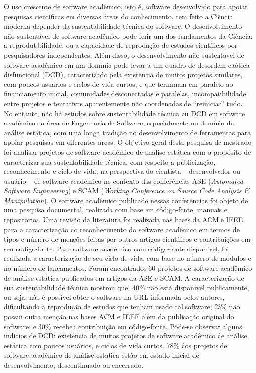 O uso crescente de software acadêmico, isto é, software desenvolvido para
apoiar pesquisas científicas em diversas áreas do conhecimento, tem feito
a Ciência moderna depender da sustentabilidade técnica do software.
%
O desenvolvimento não sustentável de software acadêmico pode ferir um dos
fundamentos da Ciência: a reprodutibilidade, ou a capacidade de reprodução de
estudos científicos por pesquisadores independentes.
%
Além disso, o desenvolvimento não sustentável de software acadêmico em um
domínio pode levar a um quadro de desordem caótica disfuncional (DCD),
caracterizado pela existência de muitos projetos similares, com poucos usuários
e ciclos de vida curtos, e que terminam em paralelo ao financiamento inicial,
comunidades desconectadas e paralelas, incompatibilidade entre projetos e
tentativas aparentemente não coordenadas de ``reiniciar'' tudo.
%
No entanto, não há
estudos sobre sustentabilidade técnica ou DCD em software acadêmico da
área de Engenharia de Software, especialmente no domínio de análise estática,
com uma longa tradição no desenvolvimento de ferramentas para apoiar pesquisas
em diferentes áreas.
%
O objetivo geral desta pesquisa de mestrado foi analisar projetos de
software acadêmico de análise estática 
com o propósito de caracterizar sua sustentabilidade técnica, 
com respeito a publicização, reconhecimento e ciclo de vida, 
na perspectiva do cientista -- desenvolvedor ou usuário -- de software
acadêmico no contexto das conferências 
ASE ({\it Automated Software Engineering}) e SCAM ({\it Working Conference on Source Code
Analysis \& Manipulation}).
%
O software acadêmico publicado nessas conferências 
foi objeto de uma pesquisa documental, realizada com base em código-fonte, 
manuais e repositórios.
%
Uma revisão da literatura foi realizada nas bases da ACM e IEEE
para a caracterização do reconhecimento do software acadêmico
em termos de tipos e número de menções feitas por outros artigos científicos e
contribuições em seu código-fonte.
%
Para software acadêmico com código-fonte disponível, 
foi realizada a caracterização de seu ciclo de vida,
com base no número de módulos e no número de lançamentos.
%
Foram encontrados 60 projetos de software acadêmico de análise estática
publicados em artigos da ASE e SCAM.
%
A caracterização de sua sustentabilidade técnica mostrou que: 
40\% não está disponível publicamente, ou seja, não é possível obter 
o software na URL informada pelos autores, dificultando
a reprodução de estudos que tenham usado tal software;
%
23\% não possui outra menção nas bases ACM e IEEE além da publicação original
do software; e 30\% recebeu contribuição em código-fonte.
%
Pôde-se observar alguns indícios de DCD: 
existência de muitos projetos de software acadêmico de análise estática
com poucos usuários, e ciclos de vida curtos.
%
78\% dos projetos de software acadêmico de análise estática estão em
estado inicial de desenvolvimento, descontinuado ou encerrado.
